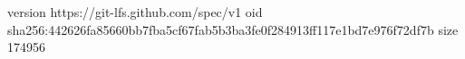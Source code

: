 version https://git-lfs.github.com/spec/v1
oid sha256:442626fa85660bb7fba5cf67fab5b3ba3fe0f284913ff117e1bd7e976f72df7b
size 174956
